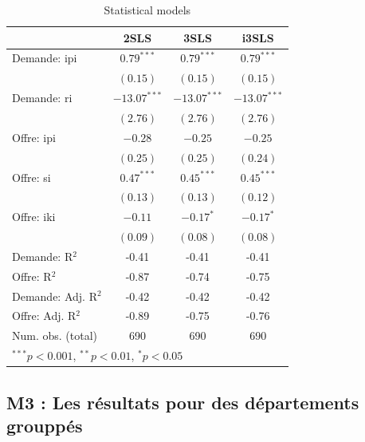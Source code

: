 \documentclass[11pt,]{article}
\begin{document}
\begin{table}[!htbp]
\begin{center}
\begin{tabular}{l c c c }
\hline
 & 2SLS & 3SLS & i3SLS \\
\hline
Demande: ipi        & $0.79^{***}$   & $0.79^{***}$   & $0.79^{***}$   \\
                    & $(0.15)$       & $(0.15)$       & $(0.15)$       \\
Demande: ri         & $-13.07^{***}$ & $-13.07^{***}$ & $-13.07^{***}$ \\
                    & $(2.76)$       & $(2.76)$       & $(2.76)$       \\
Offre: ipi          & $-0.28$        & $-0.25$        & $-0.25$        \\
                    & $(0.25)$       & $(0.25)$       & $(0.24)$       \\
Offre: si           & $0.47^{***}$   & $0.45^{***}$   & $0.45^{***}$   \\
                    & $(0.13)$       & $(0.13)$       & $(0.12)$       \\
Offre: iki          & $-0.11$        & $-0.17^{*}$    & $-0.17^{*}$    \\
                    & $(0.09)$       & $(0.08)$       & $(0.08)$       \\
\hline
Demande: R$^2$      & -0.41          & -0.41          & -0.41          \\
Offre: R$^2$        & -0.87          & -0.74          & -0.75          \\
Demande: Adj. R$^2$ & -0.42          & -0.42          & -0.42          \\
Offre: Adj. R$^2$   & -0.89          & -0.75          & -0.76          \\
Num. obs. (total)   & 690            & 690            & 690            \\
\hline
\multicolumn{4}{l}{\scriptsize{$^{***}p<0.001$, $^{**}p<0.01$, $^*p<0.05$}}
\end{tabular}
\caption{Statistical models}
\label{table : 2sls, 3sls and fiml}
\end{center}
\end{table}

\FloatBarrier

\hypertarget{m3-les-resultats-pour-des-departements-grouppes}{%
\subsection{M3 : Les résultats pour des départements
grouppés}\label{m3-les-resultats-pour-des-departements-grouppes}}
\end{document}
